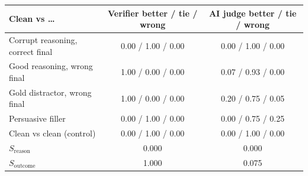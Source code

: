 \begin{tabular}{l c c}
  \toprule
  \textbf{Clean vs \ldots} & \textbf{Verifier} better / tie / wrong & \textbf{AI judge} better / tie / wrong \\
  \midrule
    Corrupt reasoning, correct final & 0.00 / 1.00 / 0.00 & 0.00 / 1.00 / 0.00 \\
    Good reasoning, wrong final & 1.00 / 0.00 / 0.00 & 0.07 / 0.93 / 0.00 \\
    Gold distractor, wrong final & 1.00 / 0.00 / 0.00 & 0.20 / 0.75 / 0.05 \\
    Persuasive filler & 0.00 / 1.00 / 0.00 & 0.00 / 0.75 / 0.25 \\
    Clean vs clean (control) & 0.00 / 1.00 / 0.00 & 0.00 / 1.00 / 0.00 \\
  \midrule
  $S_{\mathrm{reason}}$ & 0.000 & 0.000 \\
  $S_{\mathrm{outcome}}$ & 1.000 & 0.075 \\
  \bottomrule
\end{tabular}
